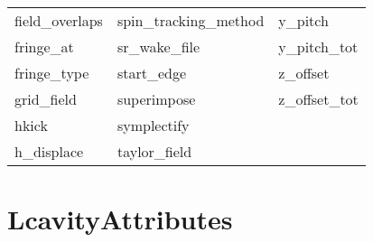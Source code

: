\begin{tabular}{lll}
field_overlaps              & spin_tracking_method        & y_pitch                     \\
fringe_at                   & sr_wake_file                & y_pitch_tot                 \\
fringe_type                 & start_edge                  & z_offset                    \\
grid_field                  & superimpose                 & z_offset_tot                \\
hkick                       & symplectify                 &                             \\
h_displace                  & taylor_field                &                             \\
 \bottomrule
 \end{tabular}
 \vfill
 
 \section{LcavityAttributes}
 \label{s:list.lcavity}
 

